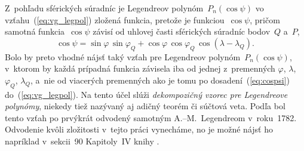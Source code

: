 \documentclass[a4paper, 12pt]{book}
\begin{document}
Z~pohľadu sférických súradníc je Legendreov polynóm~$P_n(\cos\psi)$ vo 
vzťahu~(\ref{eq:vg_legpol}) zložená funkcia, pretože je funkciou~$\cos\psi$, 
pričom samotná funkcia~$\cos\psi$ závisí od uhlovej časti sférických súradníc 
bodov~$Q$ a~$P$,
%
\begin{equation}
\label{eq:cospsi}
\cos\psi = \sin\varphi \, \sin\varphi_Q + \cos\varphi \, \cos\varphi_Q \,
\cos(\lambda - \lambda_Q){.}
\end{equation}
%
Bolo by preto vhodné nájsť taký vzťah pre Legendreov polynóm~$P_n(\cos\psi)$,
v~ktorom by každá prípadná funkcia závisela iba od jednej z~premenných
$\varphi$, $ \lambda$, $\varphi_Q$, $\lambda_Q$, a~nie od viacerých
premenných ako je tomu po dosadení~(\ref{eq:cospsi})
do~(\ref{eq:vg_legpol}).  Na tento účel slúži \emph{dekompozičný vzorec pre
Legendreove polynómy}, niekedy tiež nazývaný aj adičný teorém či súčtová veta.
Podľa \textcite{Hobson} bol tento vzťah po prvýkrát odvodený samotným
A.--M.~Legendreom v~roku~1782.  Odvodenie kvôli zložitosti v~tejto práci
vynecháme, no je možné nájsť ho napríklad v~sekcii~90 Kapitoly~IV knihy
\textcite{Hobson}.
\end{document}
